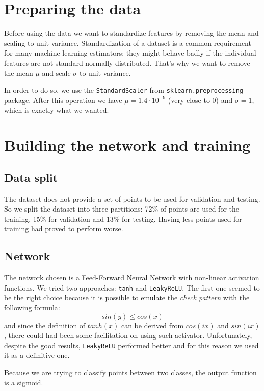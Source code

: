 \documentclass[compsoc]{IEEEtran}
\begin{document}
\section{Preparing the data}
Before using the data we want to standardize features by removing the mean and scaling to unit variance. Standardization of a dataset is a common requirement for many machine learning estimators: they might behave badly if the individual features are not standard normally distributed. That's why we want to remove the mean $\mu$ and scale $\sigma$ to unit variance. \par
In order to do so, we use the \texttt{StandardScaler} from \texttt{sklearn.preprocessing} package. After this operation we have  $\mu=1.4 \cdot 10^{-9}$ (very close to 0) and $\sigma = 1$, which is exactly what we wanted.

\section{Building the network and training}
\subsection{Data split}
The dataset does not provide a set of points to be used for validation and testing. So we split the dataset into three partitions: 72\% of points are used for the training, 15\% for validation and 13\% for testing. Having less points used for training had proved to perform worse.

\subsection{Network}
The network chosen is a Feed-Forward Neural Network with non-linear activation functions. We tried two approaches: \texttt{tanh} and \texttt{LeakyReLU}. The first one seemed to be the right choice because it is possible to emulate the \emph{check pattern} with the following formula:
\[sin(y) \leq cos(x)\]
and since the definition of $tanh(x)$ can be derived from $cos(ix)$ and $sin(ix)$, there could had been some facilitation on using such activator. Unfortunately, despite the good results,
\texttt{LeakyReLU} performed better and for this reason we used it as a definitive one. \par

Because we are trying to classify points between two classes, the output function is a sigmoid. \par
\end{document}
